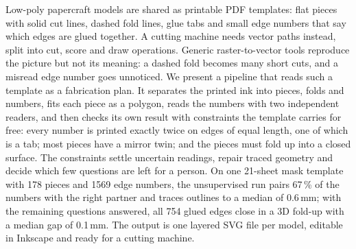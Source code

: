 Low-poly papercraft models are shared as printable PDF templates: flat pieces with solid cut
lines, dashed fold lines, glue tabs and small edge numbers that say which edges are glued
together. A cutting machine needs vector paths instead, split into cut, score and draw
operations. Generic raster-to-vector tools reproduce the picture but not its meaning: a
dashed fold becomes many short cuts, and a misread edge number goes unnoticed. We present a
pipeline that reads such a template as a fabrication plan. It separates the printed ink into
pieces, folds and numbers, fits each piece as a polygon, reads the numbers with two
independent readers, and then checks its own result with constraints the template carries
for free: every number is printed exactly twice on edges of equal length, one of which is a
tab; most pieces have a mirror twin; and the pieces must fold up into a closed surface. The
constraints settle uncertain readings, repair traced geometry and decide which few questions
are left for a person. On one 21-sheet mask template with 178 pieces and 1569 edge numbers,
the unsupervised run pairs 67\,\% of the numbers with the right partner and traces outlines
to a median of 0.6\,mm; with the remaining questions answered, all 754 glued edges close in a
3D fold-up with a median gap of 0.1\,mm. The output is one layered SVG file per model,
editable in Inkscape and ready for a cutting machine.
